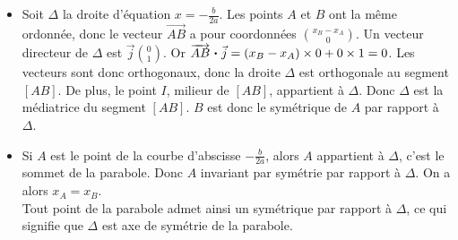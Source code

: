 \documentclass[11pt,a4paper]{article}
\newcommand{\pdt}{\mathbin{\vcenter{\hbox{\scalebox{0.6}{\textbullet}}}}}
\begin{document}
\begin{itemize}
  \item Soit $\Delta$ la droite d'équation $\displaystyle x=-\frac{b}{2a}$. Les points $A$ et $B$ ont la même ordonnée, donc le vecteur $\overrightarrow{AB}$ a pour coordonnées $\displaystyle\binom{x_B-x_A}{0}$.
  Un vecteur directeur de $\Delta$ est $\displaystyle\vec{j}\binom{0}{1}$. Or $\overrightarrow{AB}\pdt\vec{j}=(x_B-x_A)\times0+0\times1=0$.
  Les vecteurs sont donc orthogonaux, donc la droite $\Delta$ est orthogonale au segment $[AB]$.
  De plus, le point $I$, milieur de $[AB]$, appartient à $\Delta$. Donc $\Delta$ est la médiatrice du segment $[AB]$.
  $B$ est donc le symétrique de $A$ par rapport à $\Delta$.

  \item Si $A$ est le point de la courbe d'abscisse $-\frac{b}{2a}$, alors $A$ appartient à $\Delta$, c'est le sommet de la parabole.
  Donc $A$ invariant par symétrie par rapport à $\Delta$. On a alors $x_A=x_B$. \\
  Tout point de la parabole admet ainsi un symétrique par rapport à $\Delta$, ce qui signifie que $\Delta$ est axe de symétrie de la parabole. 
\end{itemize}
  
\end{document}
